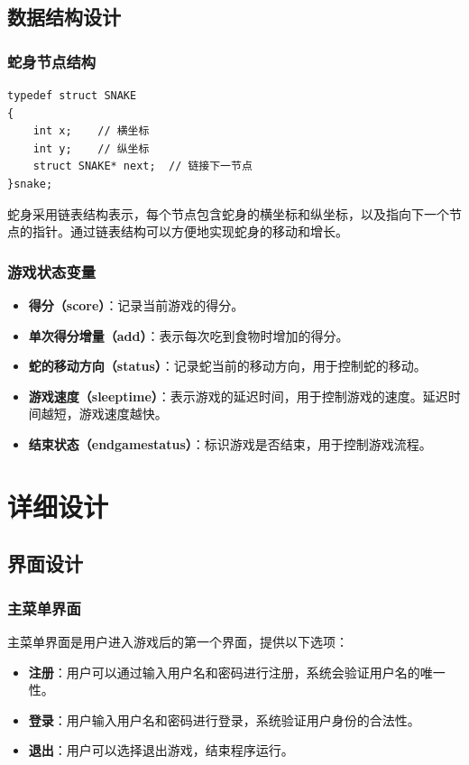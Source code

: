 \documentclass{article}
\begin{document}
\subsection{数据结构设计}

\subsubsection{蛇身节点结构}
\begin{verbatim}
typedef struct SNAKE
{
    int x;    // 横坐标
    int y;    // 纵坐标
    struct SNAKE* next;  // 链接下一节点
}snake;
\end{verbatim}
蛇身采用链表结构表示，每个节点包含蛇身的横坐标和纵坐标，以及指向下一个节点的指针。通过链表结构可以方便地实现蛇身的移动和增长。

\subsubsection{游戏状态变量}
\begin{itemize}
    \item \textbf{得分（score）}：记录当前游戏的得分。
    \item \textbf{单次得分增量（add）}：表示每次吃到食物时增加的得分。
    \item \textbf{蛇的移动方向（status）}：记录蛇当前的移动方向，用于控制蛇的移动。
    \item \textbf{游戏速度（sleeptime）}：表示游戏的延迟时间，用于控制游戏的速度。延迟时间越短，游戏速度越快。
    \item \textbf{结束状态（endgamestatus）}：标识游戏是否结束，用于控制游戏流程。
\end{itemize}

\section{详细设计}

\subsection{界面设计}
\subsubsection{主菜单界面}
主菜单界面是用户进入游戏后的第一个界面，提供以下选项：
\begin{itemize}
    \item \textbf{注册}：用户可以通过输入用户名和密码进行注册，系统会验证用户名的唯一性。
    \item \textbf{登录}：用户输入用户名和密码进行登录，系统验证用户身份的合法性。
    \item \textbf{退出}：用户可以选择退出游戏，结束程序运行。
\end{itemize}
\end{document}
